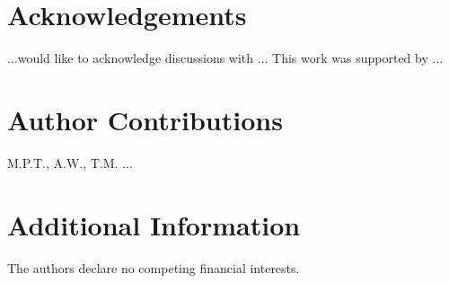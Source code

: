 \documentclass[letterpaper,english,prl,reprint,longbibliography]{revtex4-1} %
\begin{document}
\section*{Acknowledgements}
...would like to acknowledge discussions with ... This work was supported by ... 

\section*{Author Contributions}
M.P.T., A.W., T.M. ... 

\section*{Additional Information}
The authors declare no competing financial interests.

\appendix
\end{document}
